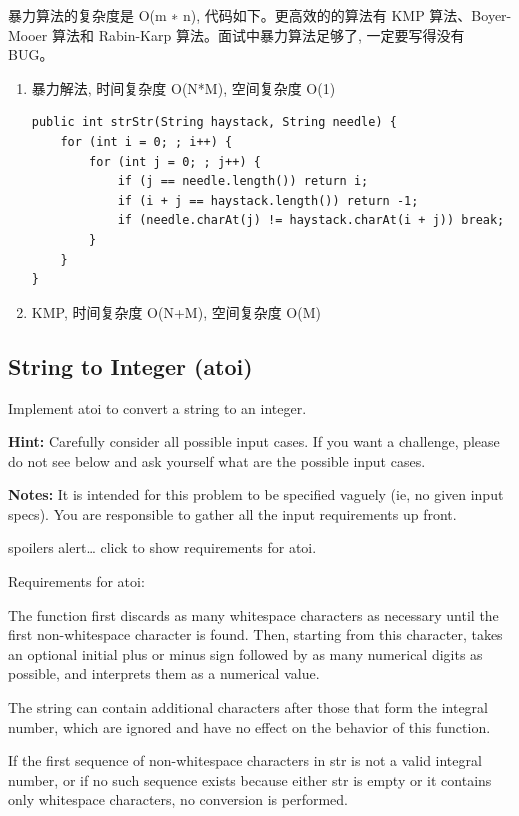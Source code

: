 \documentclass[12pt]{book}
\begin{document}
暴力算法的复杂度是 O(m ∗ n), 代码如下。更高效的的算法有 KMP 算法、Boyer-Mooer 算法和
Rabin-Karp 算法。面试中暴力算法足够了, 一定要写得没有 BUG。

\begin{enumerate}
\item 暴力解法, 时间复杂度 O(N*M), 空间复杂度 O(1)
\label{sec-2-1-2-1}
\lstset{language=java,label= ,caption= ,numbers=none}
\begin{lstlisting}
public int strStr(String haystack, String needle) {
    for (int i = 0; ; i++) {
        for (int j = 0; ; j++) {
            if (j == needle.length()) return i;
            if (i + j == haystack.length()) return -1;
            if (needle.charAt(j) != haystack.charAt(i + j)) break;
        }
    }
}
\end{lstlisting}

\item KMP, 时间复杂度 O(N+M), 空间复杂度 O(M)
\label{sec-2-1-2-2}
\end{enumerate}

\subsection{String to Integer (atoi)}
\label{sec-2-1-3}
Implement atoi to convert a string to an integer.

\textbf{Hint:} Carefully consider all possible input cases. If you want a challenge, please do not see below and ask yourself what are the possible input cases.

\textbf{Notes:} It is intended for this problem to be specified vaguely (ie, no given input specs). You are responsible to gather all the input requirements up front.

spoilers alert\ldots{} click to show requirements for atoi.

Requirements for atoi:

The function first discards as many whitespace characters as necessary until the first non-whitespace character is found. Then, starting from this character, takes an optional initial plus or minus sign followed by as many numerical digits as possible, and interprets them as a numerical value.

The string can contain additional characters after those that form the integral number, which are ignored and have no effect on the behavior of this function.

If the first sequence of non-whitespace characters in str is not a valid integral number, or if no such sequence exists because either str is empty or it contains only whitespace characters, no conversion is performed.
\end{document}
